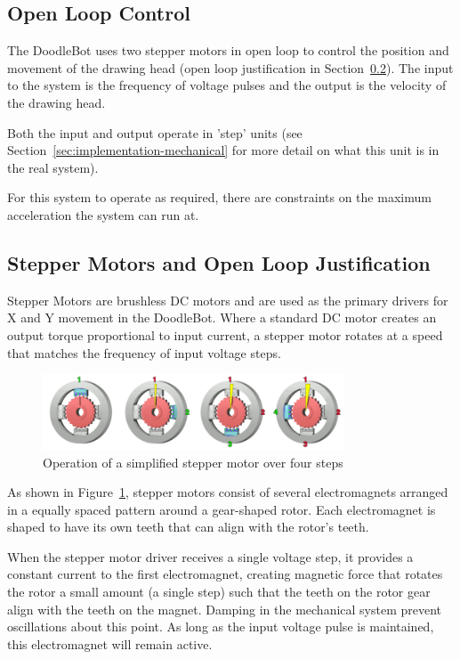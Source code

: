 \subsection{Open Loop Control}
	The DoodleBot uses two stepper motors in open loop to control the position and movement of the drawing head (open loop justification in Section~\ref{sec:control-stepper}). The input to the system is the frequency of voltage pulses and the output is the velocity of the drawing head. 
	
	Both the input and output operate in 'step' units (see Section~\ref*{sec:implementation-mechanical} for more detail on what this unit is in the real system).
	
	For this system to operate as required, there are constraints on the maximum acceleration the system can run at.
	
\subsection{Stepper Motors and Open Loop Justification}
		\label{sec:control-stepper}
			
		Stepper Motors are brushless DC motors and are used as the primary drivers for X and Y movement in the DoodleBot. Where a standard DC motor creates an output torque proportional to input current, a stepper motor rotates at a speed that matches the frequency of input voltage steps.
		
		\begin{figure}[h]
			\centering
			\includegraphics[width=0.8\textwidth]{figures/optimisation/steppermotor}
			\caption{Operation of a simplified stepper motor over four steps}
			\label{fig:stepper}
		\end{figure}
		
		As shown in Figure~\ref{fig:stepper}, stepper motors consist of several electromagnets arranged in a equally spaced pattern around a gear-shaped rotor. Each electromagnet is shaped to have its own teeth that can align with the rotor's teeth. 
		
		When the stepper motor driver receives a single voltage step, it provides a constant current to the first electromagnet, creating magnetic force that rotates the rotor a small amount (a single step) such that the teeth on the rotor gear align with the teeth on the magnet. Damping in the mechanical system prevent oscillations about this point. As long as the input voltage pulse is maintained, this electromagnet will remain active.
		
